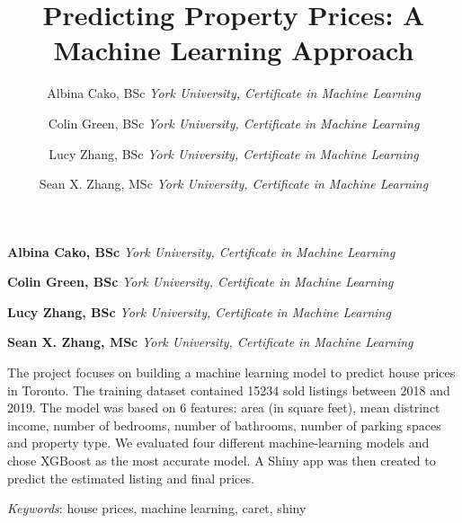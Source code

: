 \documentclass[11pt,]{article}
\title{Predicting Property Prices: A Machine Learning Approach  }
\author{\Large Albina Cako, BSc\vspace{0.05in} \newline\normalsize\emph{York University, Certificate in Machine Learning}   \and \Large Colin Green, BSc\vspace{0.05in} \newline\normalsize\emph{York University, Certificate in Machine Learning}   \and \Large Lucy Zhang, BSc\vspace{0.05in} \newline\normalsize\emph{York University, Certificate in Machine Learning}   \and \Large Sean X. Zhang, MSc\vspace{0.05in} \newline\normalsize\emph{York University, Certificate in Machine Learning}  }
\date{}
\newcommand*{\authorfont}{\fontfamily{phv}\selectfont}
\renewenvironment{abstract}
 {{%
    \setlength{\leftmargin}{0mm}
    \setlength{\rightmargin}{\leftmargin}%
  }%
  \relax}
 {\endlist}
\begin{document}
	
%

{%
\setlength{\parindent}{0pt}
\thispagestyle{plain}
{\fontsize{18}{20}\selectfont\raggedright 
\maketitle  %

}

{
   \vskip 13.5pt\relax \normalsize\fontsize{11}{12} 
\textbf{\authorfont Albina Cako, BSc} \hskip 15pt \emph{\small York University, Certificate in Machine Learning}   \par \textbf{\authorfont Colin Green, BSc} \hskip 15pt \emph{\small York University, Certificate in Machine Learning}   \par \textbf{\authorfont Lucy Zhang, BSc} \hskip 15pt \emph{\small York University, Certificate in Machine Learning}   \par \textbf{\authorfont Sean X. Zhang, MSc} \hskip 15pt \emph{\small York University, Certificate in Machine Learning}   

}

}








\begin{abstract}

    \hbox{\vrule height .2pt width 39.14pc}

    \vskip 8.5pt %

\noindent The project focuses on building a machine learning model to predict
house prices in Toronto. The training dataset contained 15234 sold
listings between 2018 and 2019. The model was based on 6 features: area
(in square feet), mean distrinct income, number of bedrooms, number of
bathrooms, number of parking spaces and property type. We evaluated four
different machine-learning models and chose XGBoost as the most accurate
model. A Shiny app was then created to predict the estimated listing and
final prices.


\vskip 8.5pt \noindent \emph{Keywords}: house prices, machine learning, caret, shiny \par

    \hbox{\vrule height .2pt width 39.14pc}



\end{abstract}
\end{document}
